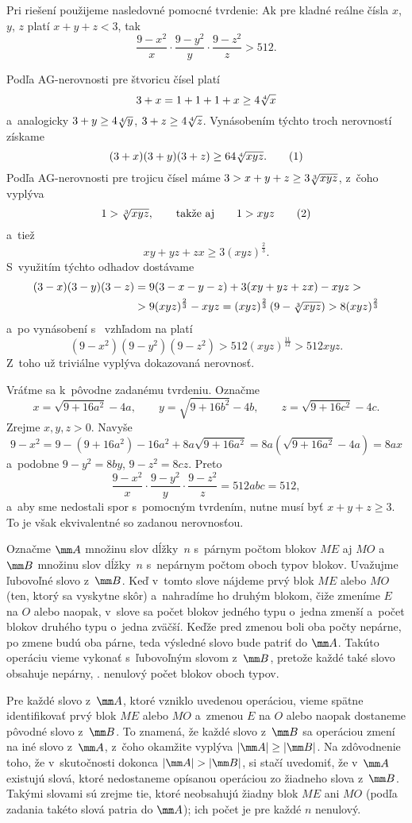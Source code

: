 {%
Pri riešení použijeme nasledovné pomocné tvrdenie: Ak pre kladné reálne čísla $x$, $y$, $z$ platí $x+y+z<3$, tak
$$
\frac{9-x^2}x\cdot\frac{9-y^2}y\cdot\frac{9-z^2}z>512.
$$

\dokaz
Podľa AG-nerovnosti pre štvoricu čísel platí
$$
3+x=1+1+1+x\ge4\root4\of x
$$
a~analogicky $3+y\ge4\root4\of y$, $3+z\ge4\root4\of z$. Vynásobením týchto troch nerovností získame
$$
(3+x)(3+y)(3+z)\ge64\root4\of{xyz}.
\tag1
$$
Podľa AG-nerovnosti pre trojicu čísel máme $3>x+y+z\ge3\root3\of{xyz}$, z~čoho vyplýva
$$
1>\root3\of{xyz},\qquad\text{takže aj}\qquad 1>xyz
\tag2
$$
a~tiež
$$
xy+yz+zx\ge3(xyz)^{\frac23}.
$$
S~využitím týchto odhadov dostávame
$$
\aligned
(3-x)(3-y)(3-z)&=9(3-x-y-z)+3(xy+yz+zx)-xyz>\\
               &>9(xyz)^{\frac23}-xyz=(xyz)^{\frac23}\left(9-\root3\of{xyz}\right)>8(xyz)^{\frac23}
\endaligned
$$
a~po vynásobení s~ vzhľadom na  platí
$$
(9-x^2)(9-y^2)(9-z^2)>512(xyz)^{\frac{11}{12}}>512xyz.
$$
Z~toho už triviálne vyplýva dokazovaná nerovnosť.

\smallskip
Vráťme sa k~pôvodne zadanému tvrdeniu. Označme
$$
x=\sqrt{9+16a^2}-4a,\qquad y=\sqrt{9+16b^2}-4b,\qquad z=\sqrt{9+16c^2}-4c.
$$
Zrejme $x,y,z>0$. Navyše
$$
9-x^2=9-(9+16a^2)-16a^2+8a\sqrt{9+16a^2}=8a\left(\sqrt{9+16a^2}-4a\right)=8ax
$$
a~podobne $9-y^2=8by$, $9-z^2=8cz$. Preto
$$
\frac{9-x^2}{x}\cdot\frac{9-y^2}{y}\cdot\frac{9-z^2}{z}=512abc=512,
$$
a~aby sme nedostali spor s~pomocným tvrdením, nutne musí byť $x+y+z\ge3$. To je však ekvivalentné so zadanou nerovnosťou.
}

{%
Označme $\mm A$ množinu slov dĺžky~$n$ s~párnym počtom blokov $ME$ aj $MO$ a~$\mm B$ množinu slov dĺžky~$n$ s~nepárnym počtom oboch typov blokov. Uvažujme ľubovoľné slovo z~$\mm B$. Keď v~tomto slove nájdeme prvý blok $ME$ alebo $MO$ (ten, ktorý sa vyskytne skôr) a~nahradíme ho druhým blokom, čiže zmeníme $E$ na $O$ alebo naopak, v~slove sa počet blokov jedného typu o~jedna zmenší a~počet blokov druhého typu o~jedna zväčší. Keďže pred zmenou boli oba počty nepárne, po zmene budú oba párne, teda výsledné slovo bude patriť do $\mm A$. Takúto operáciu vieme vykonať s~ľubovoľným slovom z~$\mm B$, pretože každé také slovo obsahuje nepárny, \tj. nenulový počet blokov oboch typov.

Pre každé slovo z~$\mm A$, ktoré vzniklo uvedenou operáciou, vieme spätne identifikovať prvý blok $ME$ alebo $MO$ a~zmenou $E$ na $O$ alebo naopak dostaneme pôvodné slovo z~$\mm B$. To znamená, že každé slovo z~$\mm B$ sa operáciou zmení na iné slovo z~$\mm A$, z~čoho okamžite vyplýva $|\mm A|\ge|\mm B|$. Na zdôvodnenie toho, že v~skutočnosti dokonca $|\mm A|>|\mm B|$, si stačí uvedomiť, že v~$\mm A$ existujú slová, ktoré nedostaneme opísanou operáciou zo žiadneho slova z~$\mm B$. Takými slovami sú zrejme tie, ktoré neobsahujú žiadny blok $ME$ ani $MO$ (podľa zadania takéto slová patria do $\mm A$); ich počet je pre každé $n$ nenulový.
}

